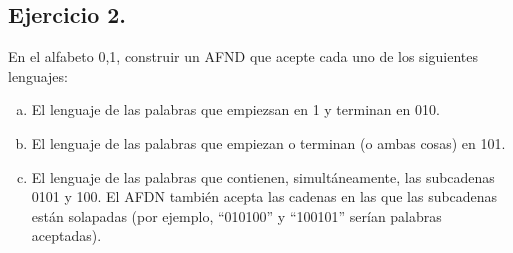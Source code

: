 \documentclass[11pt,a4paper]{article}
\begin{document}
\begin{enumerate}[a)]
\begin{figure}[H]
		\end{figure}
		
	\end{enumerate}

\subsection{Ejercicio 2.} En el alfabeto {0,1}, construir un AFND que acepte cada uno de los siguientes lenguajes:
	\begin{enumerate}[a)]
		\item El lenguaje de las palabras que empiezsan en 1 y terminan en 010.
		\item El lenguaje de las palabras que empiezan o terminan (o ambas cosas) en 101.
		\item El lenguaje de las palabras que contienen, simultáneamente, las subcadenas 0101 y 100. El AFDN	también acepta las cadenas en las que las subcadenas están solapadas (por ejemplo, ``010100'' y ``100101'' serían palabras aceptadas).
	\end{enumerate}
	
\end{document}
